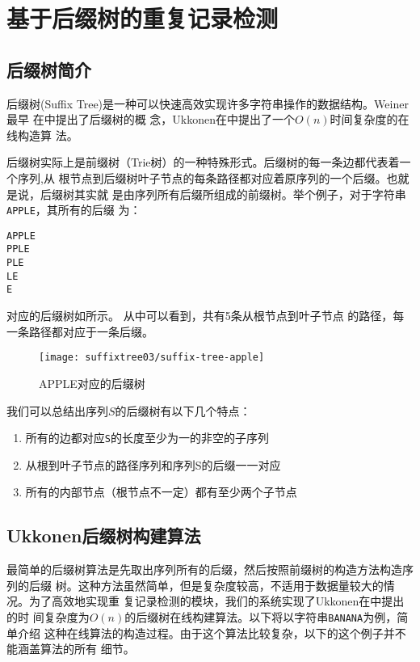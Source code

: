 
\chapter{基于后缀树的重复记录检测}
\label{chap:suffixtree}

\section{后缀树简介}
\label{sec:suffixtreeintro}
后缀树(Suffix Tree)是一种可以快速高效实现许多字符串操作的数据结构。Weiner最早
在中提出了后缀树的概
念，Ukkonen在中提出了一个$O(n)$时间复杂度的在线构造算
法。

后缀树实际上是前缀树（Trie树）的一种特殊形式。后缀树的每一条边都代表着一个序列,从
根节点到后缀树叶子节点的每条路径都对应着原序列的一个后缀。也就是说，后缀树其实就
是由序列所有后缀所组成的前缀树。举个例子，对于字符串\texttt{APPLE}，其所有的后缀
为：
\begin{verbatim}
APPLE
PPLE
PLE
LE
E
\end{verbatim}
对应的后缀树如所示。
从中可以看到，共有5条从根节点到叶子节点
的路径，每一条路径都对应于一条后缀。
\begin{figure}
  \centering
  \texttt{[image: suffixtree03/suffix-tree-apple]}
  \caption{APPLE对应的后缀树}
  \label{suffixtree:fig:suffix-tree-apple}
\end{figure}

我们可以总结出序列$S$的后缀树有以下几个特点：
\begin{enumerate}
\item 所有的边都对应\texttt{S}的长度至少为一的非空的子序列
\item 从根到叶子节点的路径序列和序列S的后缀一一对应
\item 所有的内部节点（根节点不一定）都有至少两个子节点
\end{enumerate}

\section{Ukkonen后缀树构建算法}
\label{sec:ukkonen}
最简单的后缀树算法是先取出序列所有的后缀，然后按照前缀树的构造方法构造序列的后缀
树。这种方法虽然简单，但是复杂度较高，不适用于数据量较大的情况。为了高效地实现重
复记录检测的模块，我们的系统实现了Ukkonen在中提出的时
间复杂度为$O(n)$的后缀树在线构建算法。以下将以字符串\texttt{BANANA}为例，简单介绍
这种在线算法的构造过程。由于这个算法比较复杂，以下的这个例子并不能涵盖算法的所有
细节。


